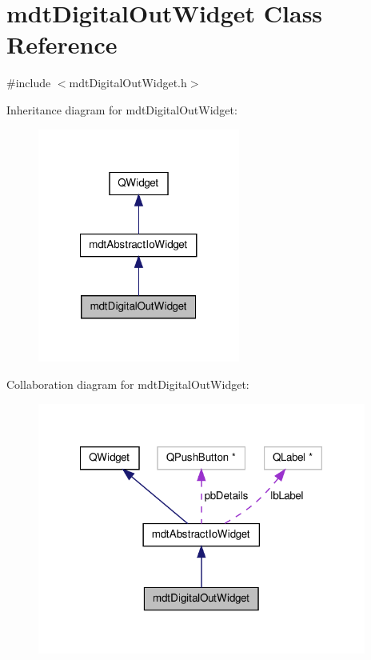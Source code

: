 \hypertarget{classmdt_digital_out_widget}{\section{mdt\-Digital\-Out\-Widget Class Reference}
\label{classmdt_digital_out_widget}
}


{\ttfamily \#include $<$mdt\-Digital\-Out\-Widget.\-h$>$}



Inheritance diagram for mdt\-Digital\-Out\-Widget\-:\nopagebreak
\begin{figure}[H]
\begin{center}
\leavevmode
\includegraphics[width=188pt]{classmdt_digital_out_widget__inherit__graph}
\end{center}
\end{figure}


Collaboration diagram for mdt\-Digital\-Out\-Widget\-:\nopagebreak
\begin{figure}[H]
\begin{center}
\leavevmode
\includegraphics[width=306pt]{classmdt_digital_out_widget__coll__graph}
\end{center}
\end{figure}
